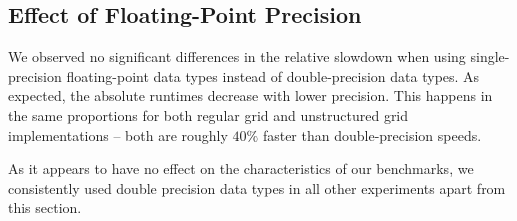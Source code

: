 \subsection{Effect of Floating-Point Precision}

We observed no significant differences in the relative slowdown when using single-precision floating-point data types instead of double-precision data types. As expected, the absolute runtimes decrease with lower precision. This happens in the same proportions for both regular grid and unstructured grid implementations -- both are roughly $40\%$ faster than double-precision speeds.

As it appears to have no effect on the characteristics of our benchmarks, we consistently used double precision data types in all other experiments apart from this section.